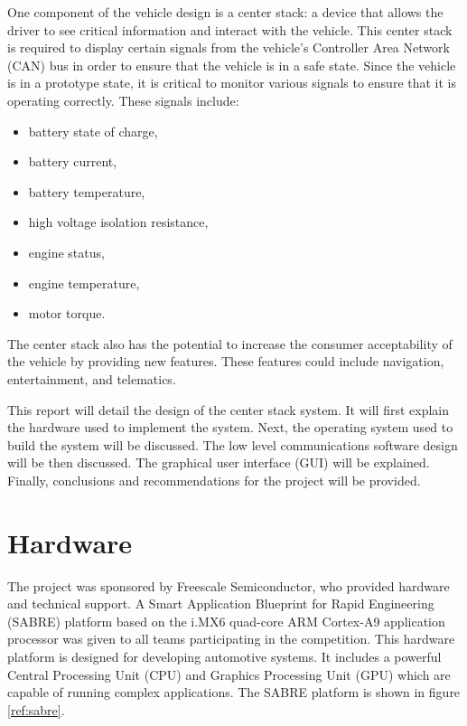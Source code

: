 \documentclass[ece]{uw-wkrpt}
\begin{document}
One component of the vehicle design is a center stack: a device that allows the
driver to see critical information and interact with the vehicle. This center
stack is required to display certain signals from the vehicle's Controller Area
Network (CAN) bus in order to ensure that the vehicle is in a safe state. Since
the vehicle is in a prototype state, it is critical to monitor various signals
to ensure that it is operating correctly. These signals include:

\begin{itemize}
    \item battery state of charge,
    \item battery current,
    \item battery temperature,
    \item high voltage isolation resistance,
    \item engine status,
    \item engine temperature,
    \item motor torque.
\end{itemize}

The center stack also has the potential to increase the consumer acceptability
of the vehicle by providing new features. These features could include
navigation, entertainment, and telematics.

This report will detail the design of the center stack system. It will first
explain the hardware used to implement the system. Next, the operating system
used to build the system will be discussed. The low level communications
software design will be then discussed. The graphical user interface (GUI) will
be explained. Finally, conclusions and recommendations for the project will be
provided.

\section{Hardware}

The project was sponsored by Freescale Semiconductor, who provided hardware and
technical support. A Smart Application Blueprint for Rapid Engineering (SABRE)
platform based on the i.MX6 quad-core ARM Cortex-A9 application processor was
given to all teams participating in the competition. This hardware platform is
designed for developing automotive systems. It includes a
powerful Central Processing Unit (CPU) and Graphics Processing Unit (GPU) which
are capable of running complex applications. The SABRE platform is shown in
figure \ref{ref:sabre}.
\end{document}
